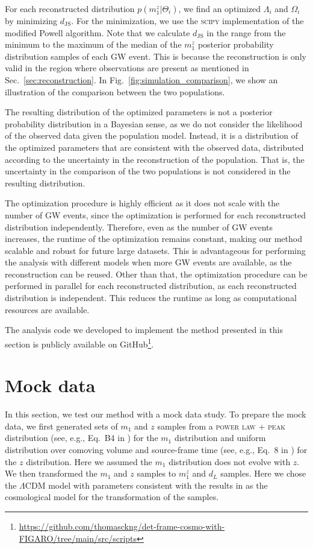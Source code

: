 \documentclass[sn-aps, pdflatex]{sn-jnl}
\begin{document}
For each reconstructed distribution $p(m^z_1|\Theta_i)$, we find an optimized $\Lambda_i$ and $\Omega_i$ by minimizing $d_\mathrm{JS}$.
For the minimization, we use the \textsc{scipy} \citep{2020SciPy-NMeth} implementation of the modified Powell algorithm.
Note that we calculate $d_\mathrm{JS}$ in the range from the minimum to the maximum of the median of the $m^z_1$ posterior probability distribution samples of each \ac{GW} event.
This is because the reconstruction is only valid in the region where observations are present as mentioned in Sec.~\ref{sec:reconstruction}.
In Fig.~\ref{fig:simulation_comparison}, we show an illustration of the comparison between the two populations.

The resulting distribution of the optimized parameters is not a posterior probability distribution in a Bayesian sense, as we do not consider the likelihood of the observed data given the population model.
Instead, it is a distribution of the optimized parameters that are consistent with the observed data, distributed according to the uncertainty in the reconstruction of the population.
That is, the uncertainty in the comparison of the two populations is not considered in the resulting distribution.

The optimization procedure is highly efficient as it does not scale with the number of \ac{GW} events, since the optimization is performed for each reconstructed distribution independently.
Therefore, even as the number of \ac{GW} events increases, the runtime of the optimization remains constant, making our method scalable and robust for future large datasets.
This is advantageous for performing the analysis with different models when more \ac{GW} events are available, as the reconstruction can be reused.
Other than that, the optimization procedure can be performed in parallel for each reconstructed distribution, as each reconstructed distribution is independent.
This reduces the runtime as long as computational resources are available.

The analysis code we developed to implement the method presented in this section is publicly available on GitHub\footnote{ \url{https://github.com/thomasckng/det-frame-cosmo-with-FIGARO/tree/main/src/scripts}}.

\section{Mock data}
\label{sec:mock_data}

In this section, we test our method with a mock data study.
To prepare the mock data, we first generated  sets of $m_1$ and $z$ samples from a \textsc{power law + peak} distribution (see, e.g., Eq.~B4 in \cite{KAGRA:2021duu}) for the $m_1$ distribution and uniform distribution over comoving volume and source-frame time (see, e.g., Eq.~8 in \cite{KAGRA:2021duu}) for the $z$ distribution.
Here we assumed the $m_1$ distribution does not evolve with $z$.
We then transformed the $m_1$ and $z$ samples to $m^z_1$ and $d_L$ samples.
Here we chose the $\Lambda$CDM model with parameters consistent with the results in \cite{Planck:2018vyg} as the cosmological model for the transformation of the samples.
\end{document}
